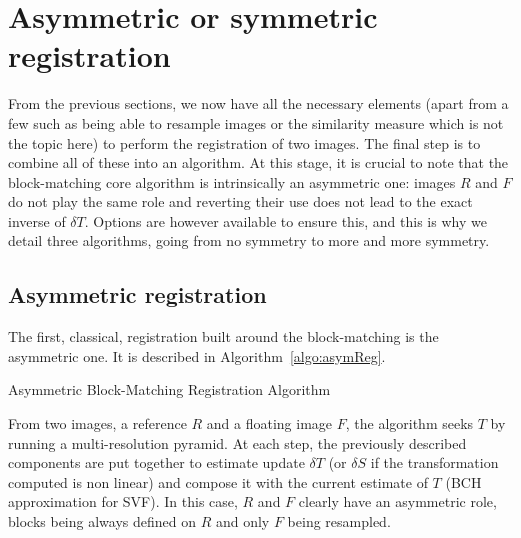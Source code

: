 \documentclass[a4paper]{article}
\begin{document}

\section{Asymmetric or symmetric registration}
\label{sec:reg-algorithms}

From the previous sections, we now have all the necessary elements (apart from a few such as being able to resample images or the similarity measure which is not the topic here) to perform the registration of two images. The final step is to combine all of these into an algorithm. At this stage, it is crucial to note that the block-matching core algorithm is intrinsically an asymmetric one: images $R$ and $F$ do not play the same role and reverting their use does not lead to the exact inverse of $\delta T$. Options are however available to ensure this, and this is why we detail three algorithms, going from no symmetry to more and more symmetry.

\subsection{Asymmetric registration} %
\label{sub:asymmetric_registration}

The first, classical, registration built around the block-matching is the asymmetric one. It is described in Algorithm~\ref{algo:asymReg}.

\begin{algorithm}[!htbp]
\caption{Asymmetric Block-Matching Registration Algorithm}
\label{algo:asymReg}
\begin{algorithmic}[1]
    \ENDFOR
  \ENDFOR
\end{algorithmic}
\end{algorithm}
From two images, a reference $R$ and a floating image $F$, the algorithm seeks $T$ by running a multi-resolution pyramid. At each step, the previously described components are put together to estimate update $\delta T$ (or $\delta S$ if the transformation computed is non linear) and compose it with the current estimate of $T$ (BCH approximation for SVF). In this case, $R$ and $F$ clearly have an asymmetric role, blocks being always defined on $R$ and only $F$ being resampled.
\end{document}
